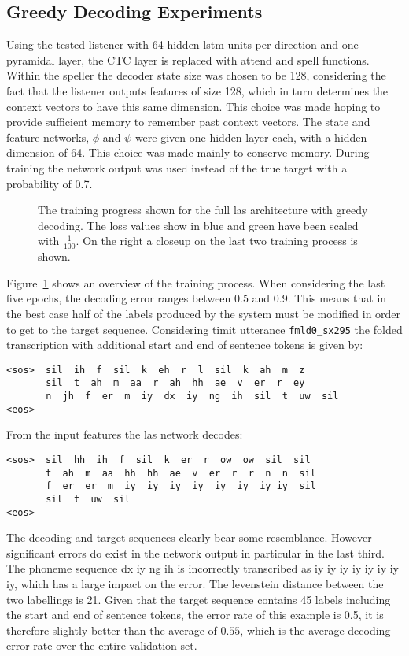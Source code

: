 \subsection{Greedy Decoding Experiments}
\label{sec:greedy}
Using the tested listener with 64 hidden lstm units per direction and one pyramidal layer, the CTC layer is replaced with attend and spell functions. Within the speller the decoder state size was chosen to be 128, considering the fact that the listener outputs features of size 128, which in turn determines the context vectors to have this same dimension. This choice was made hoping to provide sufficient memory to remember past context vectors.
The state and feature networks, $\phi$ and $\psi$ were given one hidden layer each, with a hidden dimension of 64. This choice was made mainly to conserve memory. During training the network output was used instead of the true target with a probability of 0.7.
\begin{figure}


\caption{The training progress shown for the full las architecture with greedy decoding. The loss values show in blue and green have been scaled with $\frac{1}{100}$. On the right a closeup on the last two training process is shown.}
\label{fig:lasGreedy}
\end{figure}
Figure~\ref{fig:lasGreedy} shows an overview of the training process. When considering the last five epochs, the decoding error  ranges between 0.5 and 0.9. This means that in the best case half of the labels produced by the system must be modified in order to
get to the target sequence. Considering timit utterance \texttt{fmld0\_sx295} the folded transcription with additional start and end of sentence tokens is given by:
\begin{lstlisting}[caption={Targets}]
<sos>  sil  ih  f  sil  k  eh  r  l  sil  k  ah  m  z
       sil  t  ah  m  aa  r  ah  hh  ae  v  er  r  ey
       n  jh  f  er  m  iy  dx  iy  ng  ih  sil  t  uw  sil
<eos>
\end{lstlisting}
From the input features the las network decodes:
\begin{lstlisting}[caption={Network output}]
<sos>  sil  hh  ih  f  sil  k  er  r  ow  ow  sil  sil
       t  ah  m  aa  hh  hh  ae  v  er  r  r  n  n  sil
       f  er  er  m  iy  iy  iy  iy  iy  iy  iy iy  sil
       sil  t  uw  sil
<eos>
\end{lstlisting}
The decoding and target sequences clearly bear some resemblance. However significant errors do exist in the network output in particular in the last third. The phoneme sequence dx  iy  ng  ih is incorrectly transcribed as iy  iy  iy  iy  iy  iy  iy iy,
which has a large impact on the error. The levenstein distance between the two labellings is 21. Given that the target sequence contains 45 labels including the start and end of sentence tokens, the error rate of this example is 0.5, it is therefore slightly better than the average of $0.55$, which is the average decoding error rate over the entire validation set.

